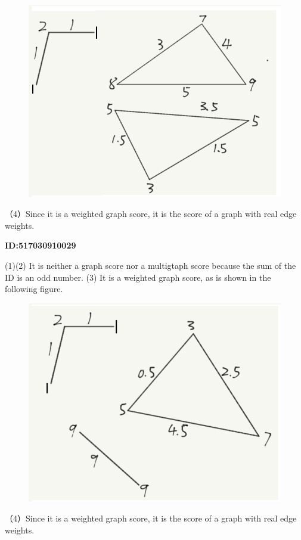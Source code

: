 \documentclass{article} %
\begin{document}
	\begin{figure}[H]
		\centering
		\includegraphics[scale=0.6]{10258.png}
		\caption{}
		\label{fig:2}
	\end{figure}
	（4）Since it is a weighted graph score, it is the score of a graph with real edge weights.

	\textbf{ID:517030910029}\par
	(1)(2) It is neither a graph score nor a multigtaph score because the sum of the ID is an odd number.
	(3) It is a weighted graph score, as is shown in the following figure.
	
	\begin{figure}[H]
		\centering
		\includegraphics[scale=0.6]{10029.png}
		\caption{}
		\label{fig:3}
	\end{figure}
	（4）Since it is a weighted graph score, it is the score of a graph with real edge weights.
\end{document}
